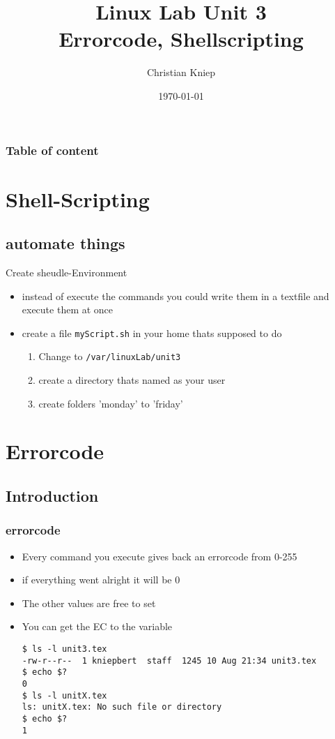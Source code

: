 \documentclass[hyperref={pdfpagelabels=false}]{beamer}
\author{Christian Kniep}
\newcommand{\code}[1]{\colorbox{lGray}{\texttt{#1}}}
\begin{document}
\title[Linux Lab Unit 2]{Linux Lab Unit 3 \\ Errorcode, Shellscripting}  
\date[\today]{\today} 

\begin{frame}
	\titlepage
\end{frame} 

\begin{frame}
	\frametitle{Table of content}
	\tableofcontents
\end{frame} 

\section{Shell-Scripting}
    \subsection{automate things}
    \begin{frame}{Create sheudle-Environment}
        \begin{itemize}
            \item<1-> instead of execute the commands you could write them in a textfile and execute them at once
            \item<2-> create a file \code{myScript.sh} in your home thats supposed to do
            \begin{enumerate}
                \item<2-> Change to \code{/var/linuxLab/unit3}
                \item<3-> create a directory thats named as your user
                \item<4-> create folders 'monday' to 'friday'
            \end{enumerate}
        \end{itemize}
    \end{frame}
\section{Errorcode} 
	\subsection{Introduction}
		\begin{frame}[fragile]
			\frametitle{errorcode}
			\begin{itemize}
				\item<1-> Every command you execute gives back an errorcode from 0-255
                \item<2-> if everything went alright it will be 0
                \item<3-> The other values are free to set
                \item<4-> You can get the EC to the variable 
                    \begin{verbatim}
$ ls -l unit3.tex 
-rw-r--r--  1 kniepbert  staff  1245 10 Aug 21:34 unit3.tex
$ echo $?
0
$ ls -l unitX.tex 
ls: unitX.tex: No such file or directory
$ echo $?
1
\end{verbatim}
            \end{itemize}
		\end{frame}
\end{document}

